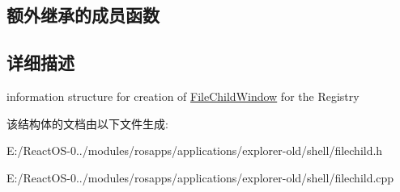 \subsection*{额外继承的成员函数}


\subsection{详细描述}
information structure for creation of \hyperlink{struct_file_child_window}{File\+Child\+Window} for the Registry 

该结构体的文档由以下文件生成\+:\begin{DoxyCompactItemize}
\item 
E\+:/\+React\+O\+S-\/0../modules/rosapps/applications/explorer-\/old/shell/filechild.\+h\item 
E\+:/\+React\+O\+S-\/0../modules/rosapps/applications/explorer-\/old/shell/filechild.\+cpp\end{DoxyCompactItemize}
